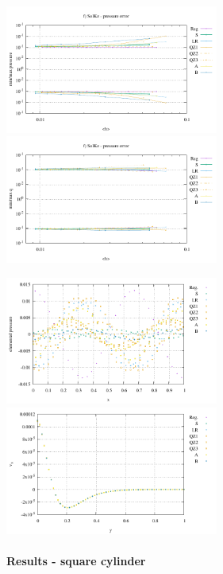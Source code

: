 \begin{center}
\includegraphics[width=7cm]{python_codes/fieldstone_78/results/mms_solkz/pstats.pdf}
\includegraphics[width=7cm]{python_codes/fieldstone_78/results/mms_solkz/qstats}
\end{center}

\begin{center}
\includegraphics[width=7cm]{python_codes/fieldstone_78/results/mms_solkz/32x32/prop}
\includegraphics[width=7cm]{python_codes/fieldstone_78/results/mms_solkz/32x32/vel_profile}
\end{center}

\newpage
\paragraph{Results - square cylinder}

